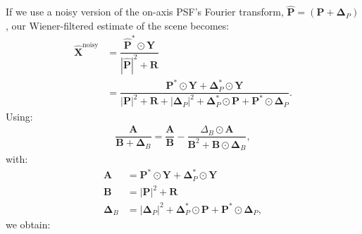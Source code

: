 If we use a noisy version of the on-axis PSF's Fourier transform, \ie $\bm{\hat{P}} = (\bm{P}+ \bm{\Delta}_P)$, 
our Wiener-filtered estimate of the scene becomes:
\begin{align}
    \bm{\hat{X}}^{\text{noisy}} &= \dfrac{\bm{\hat{P}}^* \odot \bm{Y}}{ |\bm{\hat{P}}|^2 + \bm{R}} \nonumber\\
    &= \dfrac{\bm{P}^* \odot \bm{Y}+ \bm{\Delta}_P^* \odot \bm{Y}}{|\bm{P}|^2 + \bm{R} + |\bm{\Delta}_P|^2 + \bm{\Delta}_P^* \odot \bm{P} + \bm{P}^* \odot \bm{\Delta}_P}.
\end{align}
Using:
\begin{align}
\dfrac{\bm{A}}{\bm{B}+\bm{\Delta}_B} = \dfrac{\bm{A}}{\bm{B}} - \dfrac{\Delta_B \odot \bm{A}}{\bm{B}^2 + \bm{B} \odot \bm{\Delta}_B},
\end{align}
with:
\begin{align}
    \bm{A} &= \bm{P}^* \odot \bm{Y} +\bm{\Delta}_P^* \odot \bm{Y}\\
    \bm{B} &= |\bm{P}|^2 + \bm{R}\\
    \bm{\Delta}_B &= |\bm{\Delta}_P|^2 + \bm{\Delta}_P^* \odot \bm{P} + \bm{P}^*\odot\bm{\Delta}_P,
\end{align}
we obtain:
